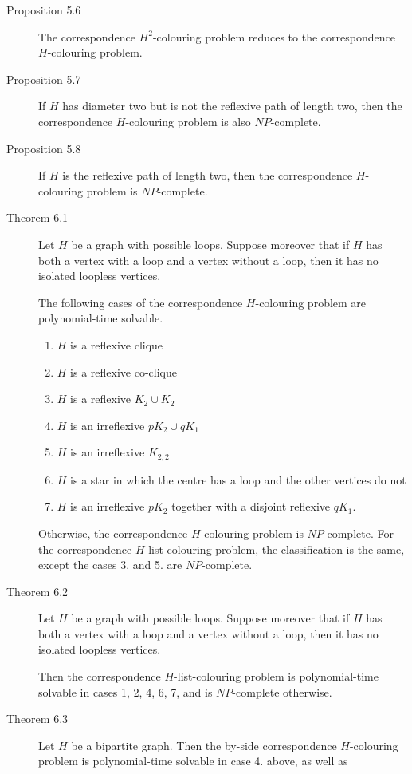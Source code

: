 \documentclass{fit-teorsem}
\begin{document}
\begin{description}
	\item[Proposition 5.6] The correspondence $H^2$-colouring problem reduces to the correspondence
		$H$-colouring problem.

	\item[Proposition 5.7] If $H$ has diameter two but is not the reflexive path of length two,
		then the correspondence $H$-colouring problem is also $NP$-complete.

	\item[Proposition 5.8] If $H$ is the reflexive path of length two, then the correspondence $H$-colouring
		problem is $NP$-complete.

	\item[Theorem 6.1] Let $H$ be a graph with possible loops. Suppose moreover that if $H$ has both
		a vertex with a loop and a vertex without a loop, then it has no isolated loopless vertices.

		The following cases of the correspondence $H$-colouring problem are polynomial-time solvable.

		\begin{enumerate}
			\item $H$ is a reflexive clique
			\item $H$ is a reflexive co-clique
			\item $H$ is a reflexive $K_2 \cup K_2$
			\item $H$ is an irreflexive $pK_2 \cup qK_1$
			\item $H$ is an irreflexive $K_{2, 2}$
			\item $H$ is a star in which the centre has a loop and the other vertices do not
			\item $H$ is an irreflexive $pK_2$ together with a disjoint reflexive $qK_1$.
		\end{enumerate}

		Otherwise, the correspondence $H$-colouring problem is $NP$-complete. For the correspondence
		$H$-list-colouring problem, the classification is the same, except the cases 3. and 5. are
		$NP$-complete.

	\item[Theorem 6.2] Let $H$ be a graph with possible loops. Suppose moreover that if $H$ has both a vertex
		with a loop and a vertex without a loop, then it has no isolated loopless vertices.

		Then the correspondence $H$-list-colouring problem is polynomial-time solvable in
		cases 1, 2, 4, 6, 7, and is $NP$-complete otherwise.

	\item[Theorem 6.3] Let $H$ be a bipartite graph. Then the by-side correspondence $H$-colouring problem
		is polynomial-time solvable in case 4. above, as well as


\end{description}
\end{document}
